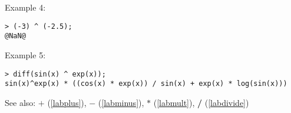 \noindent Example 4: 
\begin{center}\begin{minipage}{15cm}\begin{Verbatim}[frame=single]
> (-3) ^ (-2.5);
@NaN@
\end{Verbatim}
\end{minipage}\end{center}
\noindent Example 5: 
\begin{center}\begin{minipage}{15cm}\begin{Verbatim}[frame=single]
> diff(sin(x) ^ exp(x));
sin(x)^exp(x) * ((cos(x) * exp(x)) / sin(x) + exp(x) * log(sin(x)))
\end{Verbatim}
\end{minipage}\end{center}
See also: \textbf{$+$} (\ref{labplus}), \textbf{$-$} (\ref{labminus}), \textbf{$*$} (\ref{labmult}), \textbf{/} (\ref{labdivide})
